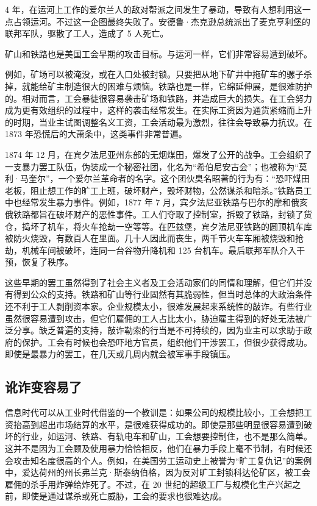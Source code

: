 4 年，在运河上工作的爱尔兰人的敌对帮派之间发生了暴动，导致有人想利用这一点占领运河。不过这一企图最终失败了。安德鲁·杰克逊总统派出了麦克亨利堡的联邦军队，驱散了工人，造成了 5 人死亡。

矿山和铁路也是美国工会早期的攻击目标。与运河一样，它们非常容易遭到破坏。

例如，矿场可以被淹没，或在入口处被封锁。只要把从地下矿井中拖矿车的骡子杀掉，就能给矿主制造很大的困难与烦恼。铁路也是一样，它绵延伸展，是很难防护的。相对而言，工会暴徒很容易袭击矿场和铁路，并造成巨大的损失。在工会努力成为更有效组织的过程中，这样的袭击经常发生。在实际工资因为通货紧缩而上升的时期，当业主试图调整名义工资，工会活动最为激烈，往往会导致暴力抗议。在 1873 年恐慌后的大萧条中，这类事件非常普遍。

1874 年 12 月，在宾夕法尼亚州东部的无烟煤田，爆发了公开的战争。工会组织了一支暴力罢工队伍，伪装成一个秘密社团，化名为“希伯尼安古会”；也被称为“莫利·马奎尔”，一个爱尔兰革命者的名字。这个团伙臭名昭著的行为有：“恐吓煤田老板，阻止想工作的旷工上班，破坏财产，毁坏财物，公然谋杀和暗杀。”铁路员工中也经常发生暴力事件。例如，1877 年 7 月，宾夕法尼亚铁路与巴尔的摩和俄亥俄铁路都旨在破坏财产的恶性事件。工人们夺取了控制室，拆毁了铁路，封锁了货仓，捣坏了机车，将火车抢劫一空等等。在匹兹堡，宾夕法尼亚铁路的圆顶机车库被防火烧毁，有数百人在里面。几十人因此而丧生，两千节火车车厢被烧毁和抢劫，机械车间被破坏，连同一台谷物升降机和 125 台机车。最后联邦军队介入干预，恢复了秩序。

这些早期的罢工虽然得到了社会主义者及工会活动家们的同情和理解，但它们并没有得到公众的支持。铁路和矿山等行业固然有其脆弱性，但当时总体的大政治条件还不利于工人剥削资本家。企业规模太小，很难发展起来系统性的敲诈。有些行业虽然很容易遭到攻击，但它们雇佣的工人占比太小，胁迫雇主得到的好处无法被广泛分享。缺乏普遍的支持，敲诈勒索的行当是不可持续的，因为业主可以求助于政府的保护。工会有时候也会恐吓地方官员，组织他们干涉罢工，但很少获得成功。即使是最暴力的罢工，在几天或几周内就会被军事手段镇压。

\subsection{讹诈变容易了}
信息时代可以从工业时代借鉴的一个教训是：如果公司的规模比较小，工会想把工资抬高到超出市场结算的水平，是很难获得成功的。即使是那些明显很容易遭到破坏的行业，如运河、铁路、有轨电车和矿山，工会想要控制住，也不是那么简单。这并不是因为工会顾及使用暴力恰恰相反，他们在暴力手段上毫不节制，有时候还会攻击知名度很高的个人。例如，在美国劳工运动史上被誉为“旷工复仇记”的案例中，爱达荷州的州长弗兰克·斯泰纳伯格，因为反对旷工封锁科达伦矿区，被工会雇佣的杀手用炸弹给炸死了。不过，在 20 世纪的超级工厂与规模化生产兴起之前，即使是通过谋杀或死亡威胁，工会的要求也很难达成。

